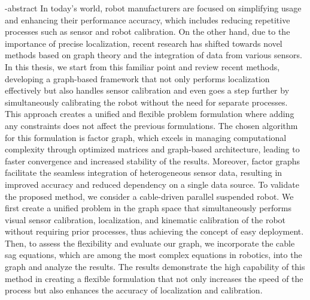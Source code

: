 
\en-abstract{
In today's world, robot manufacturers are focused on simplifying usage and enhancing their performance accuracy, which includes reducing repetitive processes such as sensor and robot calibration. On the other hand, due to the importance of precise localization, recent research has shifted towards novel methods based on graph theory and the integration of data from various sensors.
In this thesis, we start from this familiar point and review recent methods, developing a graph-based framework that not only performs localization effectively but also handles sensor calibration and even goes a step further by simultaneously calibrating the robot without the need for separate processes. This approach creates a unified and flexible problem formulation where adding any constraints does not affect the previous formulations.
The chosen algorithm for this formulation is factor graph, which excels in managing computational complexity through optimized matrices and graph-based architecture, leading to faster convergence and increased stability of the results. Moreover, factor graphs facilitate the seamless integration of heterogeneous sensor data, resulting in improved accuracy and reduced dependency on a single data source.
To validate the proposed method, we consider a cable-driven parallel suspended robot. We first create a unified problem in the graph space that simultaneously performs visual sensor calibration, localization, and kinematic calibration of the robot without requiring prior processes, thus achieving the concept of easy deployment. Then, to assess the flexibility and evaluate our graph, we incorporate the cable sag equations, which are among the most complex equations in robotics, into the graph and analyze the results. The results demonstrate the high capability of this method in creating a flexible formulation that not only increases the speed of the process but also enhances the accuracy of localization and calibration.
}
